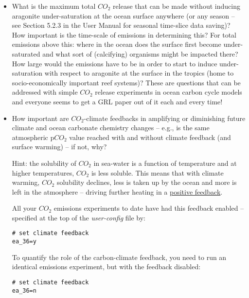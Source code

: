 \documentclass[11pt,fleqn]{book} %
\begin{document}
\begin{itemize}[noitemsep]

\vspace{1mm}
\item What is the maximum total \(CO_{2}\) release that can be made without inducing aragonite under-saturation at the ocean surface anywhere (or any season – see Section 5.2.3 in the User Manual for seasonal time-slice data saving)? How important is the time-scale of emissions in determining this? For total emissions above this: where in the ocean does the surface first become under-saturated and what sort of (calcifying) organisms might be impacted there? How large would the emissions have to be in order to start to induce under-saturation with respect to aragonite at the surface in the tropics (home to socio-economically important reef systems)? These are questions that can be addressed with simple \(CO_{2}\) release experiments in ocean carbon cycle models and everyone seems to get a GRL paper out of it each and every time!

\vspace{1mm}
\item How important are \(CO_{2}\)-climate feedbacks in amplifying or diminishing future climate and ocean carbonate chemistry changes – e.g., is the same atmospheric p\(CO_{2}\) value reached with and without climate feedback (and surface warming) – if not, why? 

Hint: the solubility of \(CO_{2}\) in sea-water is a function of temperature and at higher temperatures, \(CO_{2}\) is less soluble. This means that with climate warming, \(CO_{2}\) solubility declines, less is taken up by the ocean and more is left in the atmosphere -- driving further heating in a \uline{positive feedback}.

\vspace{1mm}
All your \(CO_{2}\) emissions experiments to date have had this feedback enabled -- specified at the top of the \textit{user-config} file by:
\vspace{-2pt}\small\begin{verbatim}
# set climate feedback
ea_36=y
\end{verbatim}\normalsize\vspace{-2pt}

To quantify the role of the carbon-climate feedback, you need to run an identical emissions experiment, but with the feedback disabled:
\vspace{-2pt}\small\begin{verbatim}
# set climate feedback
ea_36=n
\end{verbatim}\normalsize\vspace{-2pt}


\end{itemize}
\end{document}
